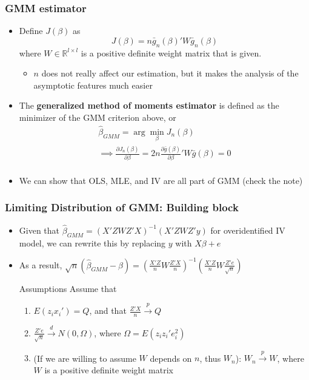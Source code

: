 \documentclass[aspectratio=169]{beamer}
\begin{document}
\begin{frame}
\frametitle{GMM estimator}
\begin{itemize}
\item  Define $J(\beta)$ as
\[
J(\beta)=n \bar{g}_n(\beta)'W\bar{g}_n(\beta)
\]
where $W\in\mathbb{R}^{l\times l}$ is a positive definite weight matrix that is given.
\begin{itemize}
 \item $n$ does not really affect our estimation, but it makes the analysis of the asymptotic features much easier
\end{itemize}
\item The \textbf{generalized method of moments estimator} is defined as the minimizer of the GMM criterion above, or
\begin{gather*}
\hat{\beta}_{GMM}=\arg\min_\beta J_n(\beta)\\
\implies\frac{\partial J_n(\beta)}{\partial \beta}=2n\frac{\partial \bar{g}(\beta)}{\partial\beta}'W\bar{g}(\beta)=0\\
\end{gather*}
\item We can show that OLS, MLE, and IV are all part of GMM (check the note)
\end{itemize}
\end{frame}


\begin{frame}
\frametitle{Limiting Distribution of GMM: Building block}
\begin{itemize}
\item  Given  that $\hat{\beta}_{GMM}=(X'ZWZ'X)^{-1}(X'ZWZ'y)$ for overidentified IV model, we can rewrite this by replacing $y$ with $X\beta+e$
\item As a result, $\sqrt{n}(\hat{\beta}_{GMM}-\beta)=\left(\frac{X'Z}{n}W\frac{Z'X}{n}\right)^{-1}\left(\frac{X'Z}{n}W\frac{Z'e}{\sqrt{n}}\right)$
\begin{block}{Assumptions}
Assume that
\begin{enumerate}
\item $E(z_ix_i')=Q$, and that $\frac{Z'X}{n}\xrightarrow{p}Q$
\item $\frac{Z'e}{\sqrt{n}}\xrightarrow{d}N(0,\Omega)$, where $\Omega = E(z_iz_i'e_i^2)$
\item (If we are willing to assume $W$ depends on $n$, thus $W_n$): $W_n\xrightarrow{p}W$, where $W$ is a positive definite weight matrix
\end{enumerate}
\end{block}
\end{itemize}
\end{frame}
\end{document}
